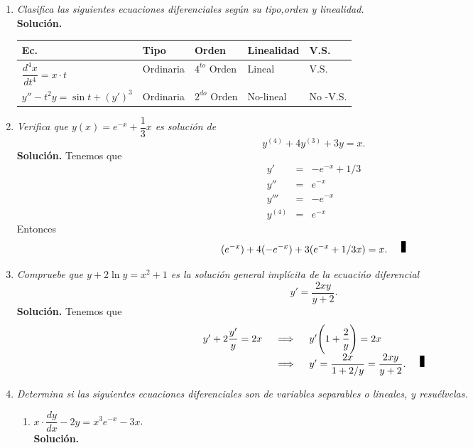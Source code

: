 \documentclass[10pt,a5paper]{article}
\begin{document}
\titulo

\begin{enumerate}
	\item \textit{Clasifica las siguientes ecuaciones diferenciales según su tipo,orden y linealidad.}  \\[2mm]
		\textbf{Solución.} 
		\begin{table}[ht]
			\centering
			\begin{tabular}{|*{5} {l|}}
				\hline 
				Ec. & Tipo & Orden & Linealidad & V.S. \\ \hline
				\(\dfrac{d^4x}{dt^4} =x \cdot t\) & Ordinaria & \(4^{to}\) Orden & Lineal & V.S. \\ \hline
				\(y'' -t^2y = \sin t+(y') ^3\) & Ordinaria & \(2^{do}\) Orden & No-lineal & No -V.S. \\ \hline
			\end{tabular}
		\end{table}
	\item \textit{Verifica que \(y(x) = e^{-x} + \dfrac{1}{3} x\) es solución de} 
		\[
			y^{(4)} +4y^{(3)} +3y=x.
		\]
		\textbf{Solución.} Tenemos que
		\[
			\begin{array}{rcl}
				y' & = & -e^{-x} +1/3 \\[2mm]
				y'' & = & e^{-x} \\[2mm]
				y''' & = & -e^{-x} \\[2mm]
				y^{(4)} & = & e^{-x}
			\end{array}
		\]
		Entonces 
		\[
			(e^{-x}) +4(-e^{-x}) +3(e^{-x} +1/3x) =x. \qed
		\]
	\item \textit{Compruebe que \(y+2 \ln y=x^2+1\) es la solución general implícita de la ecuacińo diferencial} 
		\[
			y' = \dfrac{2xy}{y+2}.
		\]
		\textbf{Solución.} Tenemos que
		\[
			\begin{array}{rcl}
				y' +2 \dfrac{y'}{y} =2x & \;\implies\; & y' \Bigg(1+ \dfrac{2}{y}\Bigg) = 2x \\[2mm]
				& \;\implies\; & y' = \dfrac{2x}{1+2/y} = \dfrac{2xy}{y+2}. \qed 
			\end{array}
		\]
	\item \textit{Determina si las siguientes ecuaciones diferenciales son de variables separables o lineales, y resuélvelas.}
		\begin{enumerate}
			\item \(x \cdot \dfrac{dy}{dx} -2y=x^3e^{-x} -3x\). \\[2mm]
				\textbf{Solución.} 
				 \\[2mm]

\end{enumerate}
\end{enumerate}
\end{document}
